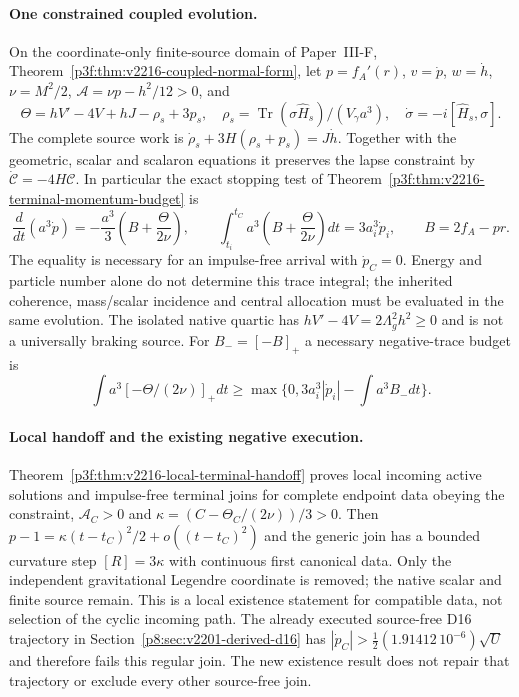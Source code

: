 \documentclass[12pt,a4paper]{article}
\begin{document}
\paragraph{One constrained coupled evolution.}
On the coordinate-only finite-source domain of
Paper~III-F, Theorem~\ref{p3f:thm:v2216-coupled-normal-form}, let
$p=f_A'(r)$, $v=\dot p$, $w=\dot h$, $\nu=M^2/2$,
$\mathcal A=\nu p-h^2/12>0$, and
\[
 \Theta=hV'-4V+hJ-\rho_s+3p_s,\quad
 \rho_s=\operatorname{Tr}(\sigma\widehat H_s)/(V_\gamma a^3),
 \quad \dot\sigma=-i[\widehat H_s,\sigma].
\]
The complete source work is
$\dot\rho_s+3H(\rho_s+p_s)=J\dot h$.
Together with the geometric, scalar and scalaron equations it preserves
the lapse constraint by $\dot{\mathcal C}=-4H\mathcal C$.
In particular the exact stopping test of
Theorem~\ref{p3f:thm:v2216-terminal-momentum-budget} is
\[
 \frac{d}{dt}(a^3\dot p)
 =-\frac{a^3}{3}\left(B+\frac{\Theta}{2\nu}\right),\qquad
 \int_{t_i}^{t_C}a^3\left(B+\frac{\Theta}{2\nu}\right)dt
       =3a_i^3\dot p_i,
 \qquad B=2f_A-pr.
\]
The equality is necessary for an impulse-free arrival with $\dot p_C=0$.
Energy and particle number alone do not determine this trace integral;
the inherited coherence, mass/scalar incidence and central allocation
must be evaluated in the same evolution.  The isolated native quartic
has $hV'-4V=2\Lambda_g^2h^2\ge0$ and is not a universally braking
source.  For $B_-=[-B]_+$ a necessary negative-trace budget is
\[
 \int a^3[-\Theta/(2\nu)]_+dt\ge
 \max\{0,3a_i^3|\dot p_i|-\int a^3B_-dt\}.
\]

\paragraph{Local handoff and the existing negative execution.}
Theorem~\ref{p3f:thm:v2216-local-terminal-handoff} proves local
incoming active solutions and impulse-free terminal joins for complete
endpoint data obeying the constraint, $\mathcal A_C>0$ and
$\kappa=(C-\Theta_C/(2\nu))/3>0$.
Then $p-1=\kappa(t-t_C)^2/2+o((t-t_C)^2)$ and the generic join has
a bounded curvature step $[R]=3\kappa$ with continuous first canonical
data.  Only the independent gravitational Legendre coordinate is removed;
the native scalar and finite source remain.  This is a local existence
statement for compatible data, not selection of the cyclic incoming path.
The already executed source-free D16 trajectory in
Section~\ref{p8:sec:v2201-derived-d16} has
$|\dot p_C|>\tfrac12(1.91412\,10^{-6})\sqrt U$ and therefore fails
this regular join.  The new existence result does not repair that
trajectory or exclude every other source-free join.
\end{document}
